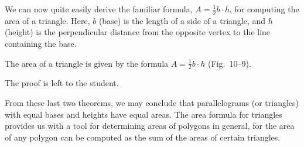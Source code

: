 \documentclass[11pt]{book}
\begin{document}
We can now quite easily derive the familiar formula,
$A = \frac{1}{2}b \cdot h$, for computing the area of a triangle. Here, $b$
(base) is the length of a side of a triangle, and $h$ (height) is the
perpendicular distance from the opposite vertex to the line containing the
base.

\FIGXNINE

\begin{theorem}
The area of a triangle is given by the formula
$A = \frac{1}{2}b \cdot h$ (Fig.~10--9).
\end{theorem}

The proof is left to the student.

From these last two theorems, we may conclude that parallelograms (or
triangles) with equal bases and heights have equal areas. The area formula for
triangles provides us with a tool for determining areas of polygons in general,
for the area of any polygon can be computed as the sum of the areas of certain
triangles.
\end{document}
